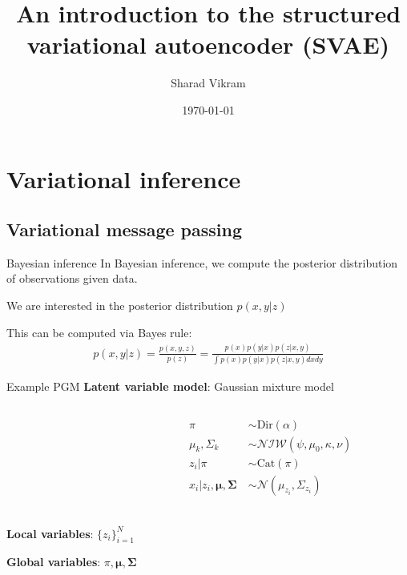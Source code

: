 \documentclass[10pt, compress]{beamer}
\title{An introduction to the structured variational autoencoder (SVAE)}
\subtitle{}
\date{\today}
\author{Sharad Vikram}
\institute{UCSD}
\begin{document}
 

\begin{frame}
  \titlepage
\end{frame}

\section{Variational inference}

\subsection{Variational message passing}

\begin{frame}{Bayesian inference}
  In Bayesian inference, we compute the posterior
  distribution of observations given data.

  \pause

    \begin{center}
      
    \end{center}
  \pause
  We are interested in the posterior distribution $p(x, y | z)$

  \pause
  This can be computed via Bayes rule:
  \begin{align*}
    p(x, y | z) = \frac{p(x, y, z)}{p(z)} = \frac{p(x)p(y | x)p(z | x, y)}{\int p(x)p(y | x)p(z | x, y)dx dy}
  \end{align*}
\end{frame}

\begin{frame}{Example PGM}
  \textbf{Latent variable model}: Gaussian mixture model
  \begin{columns}
    \begin{column}{0.5\textwidth}
      \begin{center}
        
      \end{center}
    \end{column}
    \begin{column}{0.5\textwidth}
      \begin{align*}
        \pi &\sim \textrm{Dir}(\alpha) \\
        \mu_k, \Sigma_k &\sim \mathcal{NIW}(\psi, \mu_0, \kappa, \nu) \\
        z_i | \pi &\sim \textrm{Cat}(\pi) \\
        x_i | z_i, \bm{\mu}, \bm{\Sigma} \ &\sim \mathcal{N}(\mu_{z_i}, \Sigma_{z_i}) \\
      \end{align*}
    \end{column}
  \end{columns}

  \pause
  \textbf{Local variables}: $\{z_i\}_{i=1}^N$

  \pause
  \textbf{Global variables}: $\pi, \bm{\mu}, \bm{\Sigma}$
\end{frame}
\end{document}
